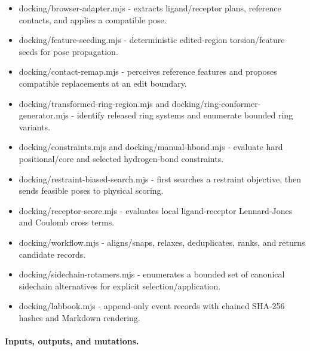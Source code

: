 \documentclass[11pt]{article}
\begin{document}
\begin{small}
\begin{itemize}[leftmargin=*]
\item docking/browser-adapter.mjs - extracts ligand/receptor plans, reference contacts, and applies a compatible pose.

\item docking/feature-seeding.mjs - deterministic edited-region torsion/feature seeds for pose propagation.

\item docking/contact-remap.mjs - perceives reference features and proposes compatible replacements at an edit boundary.

\item docking/transformed-ring-region.mjs and docking/ring-conformer-generator.mjs - identify released ring systems and enumerate bounded ring variants.

\item docking/constraints.mjs and docking/manual-hbond.mjs - evaluate hard positional/core and selected hydrogen-bond constraints.

\item docking/restraint-biased-search.mjs - first searches a restraint objective, then sends feasible poses to physical scoring.

\item docking/receptor-score.mjs - evaluates local ligand-receptor Lennard-Jones and Coulomb cross terms.

\item docking/workflow.mjs - aligns/snaps, relaxes, deduplicates, ranks, and returns candidate records.

\end{itemize}

\begin{itemize}[leftmargin=*]

\item docking/sidechain-rotamers.mjs - enumerates a bounded set of canonical sidechain alternatives for explicit selection/application.

\item docking/labbook.mjs - append-only event records with chained SHA-256 hashes and Markdown rendering.

\end{itemize}

\paragraph{Inputs, outputs, and mutations.}

\begin{itemize}[leftmargin=*]


\end{itemize}
\end{small}
\end{document}
